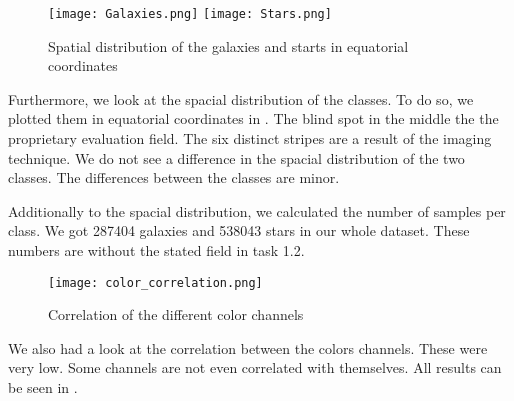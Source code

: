 \begin{figure}
    \texttt{[image: Galaxies.png]}
    \texttt{[image: Stars.png]}
    \caption{Spatial distribution of the galaxies and starts in equatorial coordinates}
    \label{distributionPlots}
\end{figure}

Furthermore, we look at the spacial distribution of the classes. To do so, we plotted them in equatorial coordinates in . The blind spot in the middle the the proprietary evaluation field. The six distinct stripes are a result of the imaging technique. We do not see a difference in the spacial distribution of the two classes. The differences between the classes are minor.

Additionally to the spacial distribution, we calculated the number of samples per class. We got 287404 galaxies and  538043 stars in our whole dataset. These numbers are without the stated field in task 1.2.

\begin{figure}
    \texttt{[image: color\_correlation.png]}
    \caption[short]{Correlation of the different color channels}
    \label{colorCorr}
\end{figure}

We also had a look at the correlation between the colors channels. These were very low. Some channels are not even correlated with themselves. All results can be seen in .
